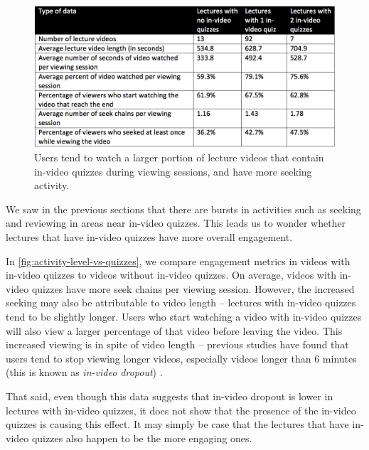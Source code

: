\documentclass{sigchi}
\begin{document}
\begin{figure}
\includegraphics[width=1.0\columnwidth]{activity-level-vs-quizzes}
\caption{Users tend to watch a larger portion of lecture videos that contain in-video quizzes during viewing sessions, and have more seeking activity.}
\label{fig:activity-level-vs-quizzes}
\end{figure}

We saw in the previous sections that there are bursts in activities such as seeking and reviewing in areas near in-video quizzes. This leads us to wonder whether lectures that have in-video quizzes have more overall engagement.

In \autoref{fig:activity-level-vs-quizzes}, we compare engagement metrics in videos with in-video quizzes to videos without in-video quizzes. On average, videos with in-video quizzes have more seek chains per viewing session. However, the increased seeking may also be attributable to video length -- lectures with in-video quizzes tend to be slightly longer. Users who start watching a video with in-video quizzes will also view a larger percentage of that video before leaving the video. This increased viewing is in spite of video length -- previous studies have found that users tend to stop viewing longer videos, especially videos longer than 6 minutes (this is known as \textit{in-video dropout}) \cite{juho}.

That said, even though this data suggests that in-video dropout is lower in lectures with in-video quizzes, it does not show that the presence of the in-video quizzes is causing this effect. It may simply be case that the lectures that have in-video quizzes also happen to be the more engaging ones.

\end{document}

